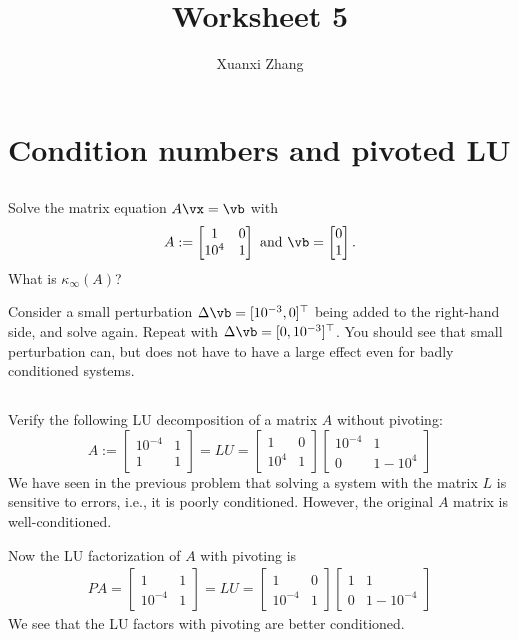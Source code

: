 \documentclass{article}%
\title{\huge Worksheet 5\\
\normalsize}
\author{Xuanxi Zhang}
\begin{document}
\maketitle

\section{Condition numbers and pivoted LU}
\subsection{}
Solve the matrix equation $ A\vx = \vb$ with 
\begin{align*}
  A:=
  \begin{bmatrix}
    1       & 0  \\
    10^{4}  & 1
  \end{bmatrix}
  \text{ and }
  \vb = \begin{bmatrix}
  0\\1
  \end{bmatrix}.
\end{align*}
What is $\kappa_\infty(A)$?

Consider a small perturbation $\Delta \vb=[10^{-3},0]^\top$ being added to the right-hand side, and solve again. Repeat with $\Delta \vb =[0,10^{-3}]^\top$. You should see that small perturbation can, but does not have to have a large effect even for badly conditioned systems.

\subsection{}
Verify the following LU decomposition of a matrix $A$ without pivoting:
  $$
  A := \begin{bmatrix} 10^{-4} & 1\\ 1 & 1
  \end{bmatrix} = L U =
  \begin{bmatrix} 1 & 0\\ 10^4 & 1
  \end{bmatrix}
  \begin{bmatrix} 10^{-4} & 1\\ 0 & 1-10^4
  \end{bmatrix}
  $$ 
We have seen in the previous problem that solving a system with the matrix $ L$ is sensitive to errors, i.e., it is poorly conditioned. However, the original $ A$ matrix is well-conditioned.

Now the LU factorization of $ A$ with pivoting is
\begin{align*}
 P A = \begin{bmatrix} 1 & 1 \\ 10^{-4} & 1
  \end{bmatrix} =  L U =
  \begin{bmatrix} 1 & 0\\ 10^{-4} & 1
  \end{bmatrix}
  \begin{bmatrix} 1 & 1\\ 0 & 1-10^{-4}
  \end{bmatrix}
\end{align*}
We see that the LU factors with pivoting are better conditioned.
\end{document}
